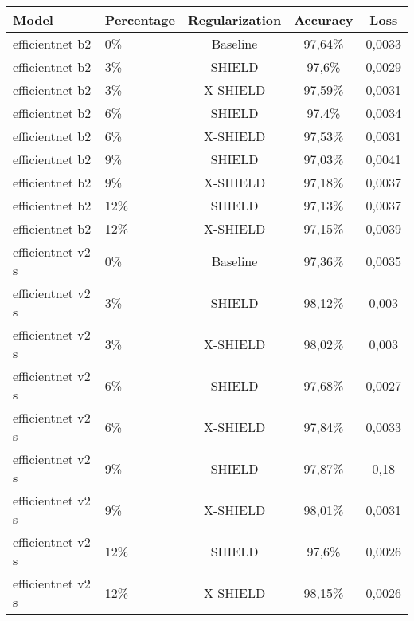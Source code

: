 \begin{tabular}{llccc}
\toprule
Model & Percentage & Regularization & Accuracy & Loss \\
\midrule
efficientnet b2 & 0\% & Baseline & 97,64\% & 0,0033 \\
efficientnet b2 & 3\% & SHIELD & 97,6\% & 0,0029 \\
efficientnet b2 & 3\% & X-SHIELD & 97,59\% & 0,0031 \\
efficientnet b2 & 6\% & SHIELD & 97,4\% & 0,0034 \\
efficientnet b2 & 6\% & X-SHIELD & 97,53\% & 0,0031 \\
efficientnet b2 & 9\% & SHIELD & 97,03\% & 0,0041 \\
efficientnet b2 & 9\% & X-SHIELD & 97,18\% & 0,0037 \\
efficientnet b2 & 12\% & SHIELD & 97,13\% & 0,0037 \\
efficientnet b2 & 12\% & X-SHIELD & 97,15\% & 0,0039 \\
efficientnet v2 s & 0\% & Baseline & 97,36\% & 0,0035 \\
efficientnet v2 s & 3\% & SHIELD & 98,12\% & 0,003 \\
efficientnet v2 s & 3\% & X-SHIELD & 98,02\% & 0,003 \\
efficientnet v2 s & 6\% & SHIELD & 97,68\% & 0,0027 \\
efficientnet v2 s & 6\% & X-SHIELD & 97,84\% & 0,0033 \\
efficientnet v2 s & 9\% & SHIELD & 97,87\% & 0,18 \\
efficientnet v2 s & 9\% & X-SHIELD & 98,01\% & 0,0031 \\
efficientnet v2 s & 12\% & SHIELD & 97,6\% & 0,0026 \\
efficientnet v2 s & 12\% & X-SHIELD & 98,15\% & 0,0026 \\
\bottomrule
\end{tabular}
